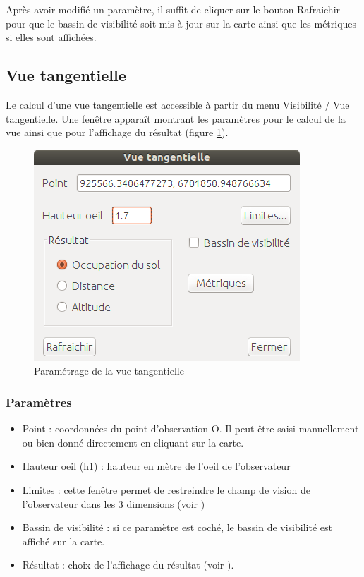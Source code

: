 \documentclass{report}
\begin{document}
Après avoir modifié un paramètre, il suffit de cliquer sur le bouton Rafraichir pour que le bassin de visibilité soit mis à jour sur la carte ainsi que les métriques si elles sont affichées.

\subsection{Vue tangentielle}

Le calcul d'une vue tangentielle est accessible à partir du menu Visibilité / Vue tangentielle. Une fenêtre apparaît montrant les paramètres pour le calcul de la vue ainsi que pour l'affichage du résultat (figure \ref{viewtan_param}). 

\begin{figure}[H]
	\includegraphics[scale=0.5]{img/viewtan_dlg-fr.png} 
	\caption{Paramétrage de la vue tangentielle}
	\label{viewtan_param}
\end{figure}

\subsubsection{Paramètres}

\begin{itemize}
	\item Point : coordonnées du point d'observation O. Il peut être saisi manuellement ou bien donné directement en cliquant sur la carte.
	\item Hauteur oeil (h1) : hauteur en mètre de l'oeil de l'observateur
	\item Limites : cette fenêtre permet de restreindre le champ de vision de l'observateur dans les 3 dimensions (voir )
	\item Bassin de visibilité : si ce paramètre est coché, le bassin de visibilité est affiché sur la carte.
	\item Résultat : choix de l'affichage du résultat (voir ).
\end{itemize}
\end{document}
